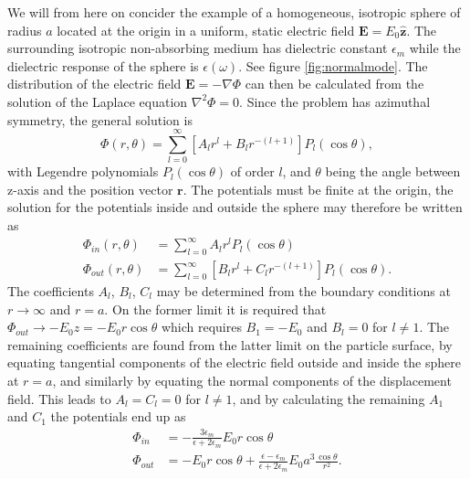 We will from here on concider the example of a homogeneous, isotropic sphere of radius $a$ located at the origin in a uniform, static electric field $\mathbf{E}=E_0\mathbf{\hat{z}}$. The surrounding isotropic non-absorbing medium has dielectric constant $\epsilon_m$ while the dielectric response of the sphere is $\epsilon(\omega)$. See figure \ref{fig:normalmode}. The distribution of the electric field $\mathbf{E}=-\nabla \Phi$ can then be calculated from the solution of the Laplace equation $\nabla ^2 \Phi = 0$\cite{griffiths}. Since the problem has azimuthal symmetry, the general solution is\cite{jackson}
\begin{equation}
    \Phi (r,\theta) = \sum_{l=0}^\infty[A_lr^l + B_lr^{-(l+1)}] P_l(\cos\theta),
\end{equation}
with Legendre polynomials $P_l(\cos\theta)$ of order $l$, and $\theta$ being the angle between z-axis and the position vector $\mathbf{r}$. The potentials must be finite at the origin, the solution for the potentials inside and outside the sphere may therefore be written as
\begin{subequations}
\begin{align}
    \Phi_{in}(r,\theta) &= \sum_{l=0}^\infty A_l r^l P_l(\cos\theta) \\
    \Phi_{out}(r,\theta) &= \sum_{l=0}^\infty [B_l r^l + C_l r^{-(l+1)}] P_l(\cos\theta). 
\end{align}
\end{subequations}
The coefficients $A_l$, $B_l$, $C_l$ may be determined from the boundary conditions at $r \to \infty$ and $r=a$. On the former limit it is required that $\Phi_{out} \to -E_0z = -E_0r\cos\theta$ which requires $B_1 = -E_0$ and $B_l=0$ for $l\neq1$. The remaining coefficients are found from the latter limit on the particle surface, by equating tangential components of the electric field outside and inside the sphere at $r=a$, and similarly by equating the normal components of the displacement field. This leads to $A_l = C_l = 0$ for $l \neq 1$, and by calculating the remaining $A_1$ and $C_1$ the potentials end up as\cite{jackson}    
\begin{subequations}
\begin{align}
    \Phi_{in} &= -\frac{3\epsilon_m}{\epsilon+2\epsilon_m}E_0 r \cos\theta  \\
    \Phi_{out} &= -E_0 r \cos\theta + \frac{\epsilon-\epsilon_m}{\epsilon+2\epsilon_m} E_0 a^3 \frac{\cos\theta}{r^2}.
    \label{eq:test}
\end{align}  
\end{subequations}
